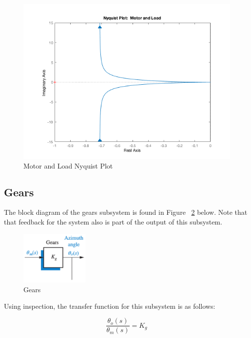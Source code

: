 \documentclass[12pt]{article}
\begin{document}
\begin{figure}[H]
\begin{center}
	\includegraphics[width=\textwidth]{./img/MotorNyquist.png}
	\caption{\label{fig:motornyquist}Motor and Load Nyquist Plot}
\end{center}
\end{figure}

\subsection{Gears}

The block diagram of the gears subsystem is found in Figure ~\ref{fig:gears} below. Note that that feedback for the system also is part of the output of this subsystem.

\begin{figure}[H]
\begin{center}
	\includegraphics[width=0.3\textwidth]{./img/GearsBlock.png}
	\caption{\label{fig:gears}Gears}
\end{center}
\end{figure}

Using inspection, the transfer function for this subsystem is as follows:

\begin{equation}
\frac{\theta_{o}(s)}{\theta_{m}(s)} = K_{g}\label{eq:5}
\end{equation}
\end{document}
